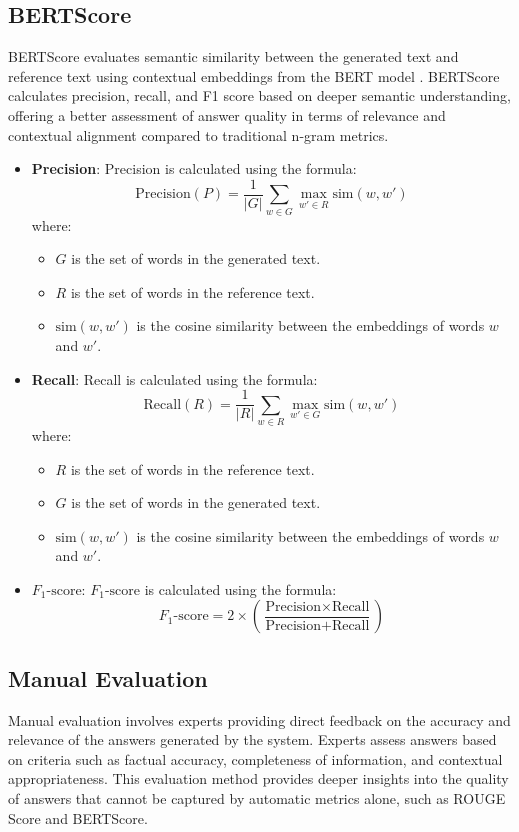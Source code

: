 \documentclass[runningheads]{llncs}
\begin{document}
\subsection{BERTScore}
BERTScore evaluates semantic similarity between the generated text and reference text using contextual embeddings from the BERT model \cite{Zhang2020}. BERTScore calculates precision, recall, and F1 score based on deeper semantic understanding, offering a better assessment of answer quality in terms of relevance and contextual alignment compared to traditional n-gram metrics.
\begin{itemize}
    \item \textbf{Precision}: Precision is calculated using the formula:
    \[
    \text{Precision} (P) = \frac{1}{|G|} \sum_{w \in G} \max_{w' \in R} \text{sim}(w, w')
    \]
    where:
    \begin{itemize}
      \item \( G \) is the set of words in the generated text.
      \item \( R \) is the set of words in the reference text.
      \item \( \text{sim}(w, w') \) is the cosine similarity between the embeddings of words \( w \) and \( w' \).
    \end{itemize}

    \item \textbf{Recall}: Recall is calculated using the formula:
    \[
    \text{Recall} (R) = \frac{1}{|R|} \sum_{w \in R} \max_{w' \in G} \text{sim}(w, w')
    \]
    where:
    \begin{itemize}
      \item \( R \) is the set of words in the reference text.
      \item \( G \) is the set of words in the generated text.
      \item \( \text{sim}(w, w') \) is the cosine similarity between the embeddings of words \( w \) and \( w' \).
    \end{itemize}

    \item \textbf{\( F_{1}\text{-score} \)}: 
    \( F_{1}\text{-score} \) is calculated using the formula:
    \[
    F_{1}\text{-score} = 2 \times \left( \frac{\text{Precision} \times \text{Recall}}{\text{Precision} + \text{Recall}} \right)
    \]
\end{itemize}
    
\subsection{Manual Evaluation}
Manual evaluation involves experts providing direct feedback on the accuracy and relevance of the answers generated by the system. Experts assess answers based on criteria such as factual accuracy, completeness of information, and contextual appropriateness. This evaluation method provides deeper insights into the quality of answers that cannot be captured by automatic metrics alone, such as ROUGE Score and BERTScore.
\end{document}
